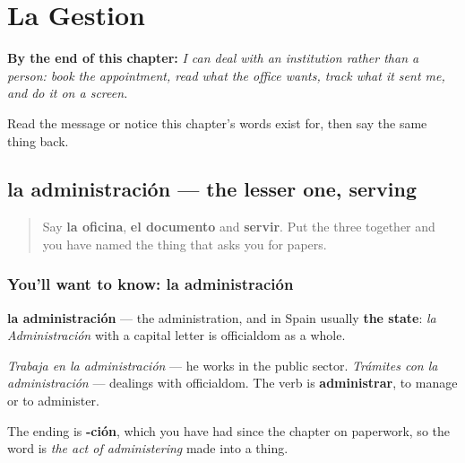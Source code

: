 
\chapter{La Gestion}
\label{ch:es-gestion}

\begin{chapteropening}
\textbf{By the end of this chapter:} \emph{I can deal with an institution rather than a person: book the appointment, read what the office wants, track what it sent me, and do it on a screen.}

Read the message or notice this chapter's words exist for, then say the same thing back.
\end{chapteropening}

\section[la administración]{la administración — the lesser one, serving}

\label{lesson:ES-C442-administracion}



\begin{quote}
Say \textbf{la oficina}, \textbf{el documento} and \textbf{servir}. Put the three together and you have named the thing that asks you for papers.
\end{quote}

\subsection*{You'll want to know: la administración}
\textbf{la administración} — the administration, and in Spain usually \textbf{the state}: \emph{la Administración} with a capital letter is officialdom as a whole.

\emph{Trabaja en la administración} — he works in the public sector. \emph{Trámites con la administración} — dealings with officialdom. The verb is \textbf{administrar}, to manage or to administer.

The ending is \textbf{-ción}, which you have had since the chapter on paperwork, so the word is \emph{the act of administering} made into a thing.

